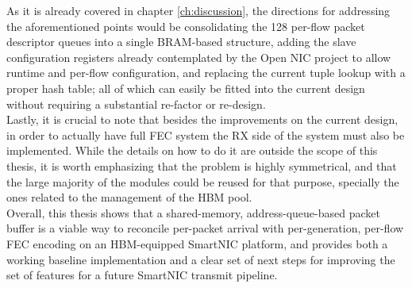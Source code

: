 As it is already covered in chapter \ref{ch:discussion}, 
the directions for addressing the aforementioned points would be 
consolidating the 128 per-flow packet descriptor queues into a single BRAM-based structure,
adding the slave configuration registers already contemplated by the Open NIC project to allow
runtime and per-flow configuration, and replacing the current tuple lookup with a proper hash
table; all of which can easily be fitted into the current design without requiring a substantial re-factor or re-design. \\

Lastly, it is crucial to note that besides the improvements on the current design, in order to 
actually have full FEC system the RX side of the system must also be implemented. While the 
details on how to do it are outside the scope of this thesis, it is worth emphasizing that the 
problem is highly symmetrical, and that the large majority of the modules could be reused for 
that purpose, specially the ones related to the management of the HBM pool. \\

Overall, this thesis shows that a shared-memory, address-queue-based packet buffer is a viable
way to reconcile per-packet arrival with per-generation, per-flow FEC encoding on an
HBM-equipped SmartNIC platform, and provides both a working baseline implementation and a clear
set of next steps for improving the set of features for a future SmartNIC transmit pipeline.
